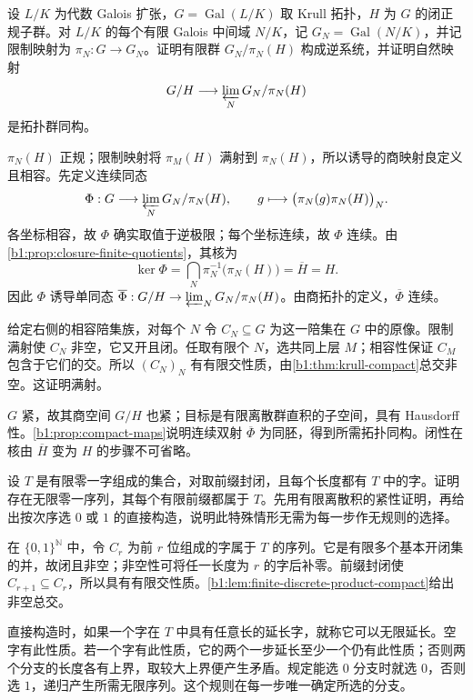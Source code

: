 \begin{exercise}\label{b1:ex:22-19}
	设 \(L/K\) 为代数 Galois 扩张，\(G=\operatorname{Gal}(L/K)\) 取 Krull 拓扑，\(H\) 为 \(G\) 的闭正规子群。对 \(L/K\) 的每个有限 Galois 中间域 \(N/K\)，记 \(G_N=\operatorname{Gal}(N/K)\)，并记限制映射为 \(\pi_N:G\to G_N\)。证明有限群 \(G_N/\pi_N(H)\) 构成逆系统，并证明自然映射
	\[
		G/H\longrightarrow\varprojlim_N G_N/\pi_N(H)
	\]
	是拓扑群同构。
\end{exercise}
\begin{solution}
	\(\pi_N(H)\) 正规；限制映射将 \(\pi_M(H)\) 满射到 \(\pi_N(H)\)，所以诱导的商映射良定义且相容。先定义连续同态
	\[
		\Phi:G\longrightarrow\varprojlim_NG_N/\pi_N(H), \qquad g\longmapsto\bigl(\pi_N(g)\pi_N(H)\bigr)_N.
	\]
	各坐标相容，故 \(\Phi\) 确实取值于逆极限；每个坐标连续，故 \(\Phi\) 连续。由\cref{b1:prop:closure-finite-quotients}，其核为
	\[
		\ker\Phi=\bigcap_N\pi_N^{-1}\bigl(\pi_N(H)\bigr)=\overline H=H.
	\]
	因此 \(\Phi\) 诱导单同态 \(\overline\Phi:G/H\to\varprojlim_NG_N/\pi_N(H)\)。由商拓扑的定义，\(\overline\Phi\) 连续。

	给定右侧的相容陪集族，对每个 \(N\) 令 \(C_N\subseteq G\) 为这一陪集在 \(G\) 中的原像。限制满射使 \(C_N\) 非空，它又开且闭。任取有限个 \(N\)，选共同上层 \(M\)；相容性保证 \(C_M\) 包含于它们的交。所以 \((C_N)_N\) 有有限交性质，由\cref{b1:thm:krull-compact}总交非空。这证明满射。

	\(G\) 紧，故其商空间 \(G/H\) 也紧；目标是有限离散群直积的子空间，具有 Hausdorff 性。\cref{b1:prop:compact-maps}说明连续双射 \(\overline\Phi\) 为同胚，得到所需拓扑同构。闭性在核由 \(\overline H\) 变为 \(H\) 的步骤不可省略。
\end{solution}

\begin{exercise}\label{b1:ex:22-20}
	设 \(T\) 是有限零一字组成的集合，对取前缀封闭，且每个长度都有 \(T\) 中的字。证明存在无限零一序列，其每个有限前缀都属于 \(T\)。先用有限离散积的紧性证明，再给出按次序选 \(0\) 或 \(1\) 的直接构造，说明此特殊情形无需为每一步作无规则的选择。
\end{exercise}
\begin{solution}
	在 \(\{0,1\}^{\mathbb N}\) 中，令 \(C_r\) 为前 \(r\) 位组成的字属于 \(T\) 的序列。它是有限多个基本开闭集的并，故闭且非空；非空性可将任一长度为 \(r\) 的字后补零。前缀封闭使 \(C_{r+1}\subseteq C_r\)，所以具有有限交性质。\cref{b1:lem:finite-discrete-product-compact}给出非空总交。

	直接构造时，如果一个字在 \(T\) 中具有任意长的延长字，就称它可以无限延长。空字有此性质。若一个字有此性质，它的两个一步延长至少一个仍有此性质；否则两个分支的长度各有上界，取较大上界便产生矛盾。规定能选 \(0\) 分支时就选 \(0\)，否则选 \(1\)，递归产生所需无限序列。这个规则在每一步唯一确定所选的分支。
\end{solution}
